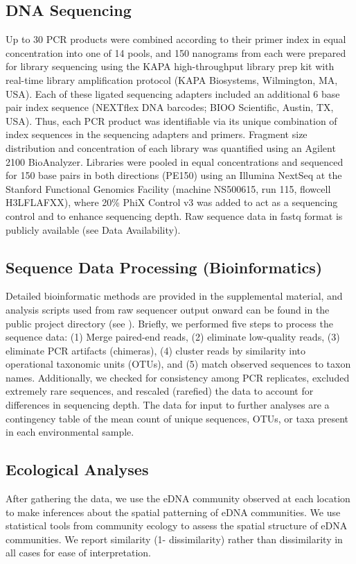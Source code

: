 \documentclass[11pt,letterpaper]{article} %
\begin{document}
\subsection*{DNA Sequencing}
Up to 30 PCR products were combined according to their primer index in equal concentration into one of 14 pools, and 150 nanograms from each were prepared for library sequencing using the KAPA high-throughput library prep kit with real-time library amplification protocol (KAPA Biosystems, Wilmington, MA, USA). Each of these ligated sequencing adapters included an additional 6 base pair index sequence (NEXTflex DNA barcodes; BIOO Scientific, Austin, TX, USA). Thus, each PCR product was identifiable via its unique combination of index sequences in the sequencing adapters and primers. Fragment size distribution and concentration of each library was quantified using an Agilent 2100 BioAnalyzer. Libraries were pooled in equal concentrations and sequenced for 150 base pairs in both directions (PE150) using an Illumina NextSeq at the Stanford Functional Genomics Facility (machine NS500615, run 115, flowcell H3LFLAFXX), where 20\% PhiX Control v3 was added to act as a sequencing control and to enhance sequencing depth. Raw sequence data in fastq format is publicly available (see Data Availability).


\subsection*{Sequence Data Processing (Bioinformatics)}
Detailed bioinformatic methods are provided in the supplemental material, and analysis scripts used from raw sequencer output onward can be found in the public project directory (see ). Briefly, we performed five steps to process the sequence data: (1) Merge paired-end reads, (2) eliminate low-quality reads, (3) eliminate PCR artifacts (chimeras), (4) cluster reads by similarity into operational taxonomic units (OTUs), and (5) match observed sequences to taxon names. Additionally, we checked for consistency among PCR replicates, excluded extremely rare sequences, and rescaled (rarefied) the data to account for differences in sequencing depth. The data for input to further analyses are a contingency table of the mean count of unique sequences, OTUs, or taxa present in each environmental sample.


\subsection*{Ecological Analyses}
After gathering the data, we use the eDNA community observed at each location to make inferences about the spatial patterning of eDNA communities. We use statistical tools from community ecology to assess the spatial structure of eDNA communities. We report similarity (1- dissimilarity) rather than dissimilarity in all cases for ease of interpretation.
\end{document}
